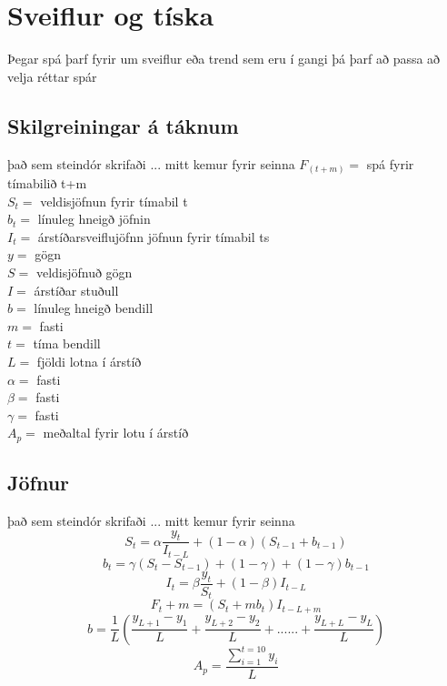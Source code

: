 \section {Sveiflur og tíska}
 

Þegar spá þarf fyrir um sveiflur eða trend sem eru í gangi þá þarf að passa að velja réttar spár

\subsection{Skilgreiningar á táknum}
 
það sem steindór skrifaði ... mitt kemur fyrir seinna
	$F_(t+m)=$ spá fyrir tímabilið  t+m \\
	$S_t =$  veldisjöfnun fyrir tímabil t\\ 	
	$b_t =$ línuleg hneigð jöfnin \\
	$I_t =$ árstíðarsveiflujöfnn jöfnun fyrir tímabil ts \\
	$y =$ gögn\\
	$S =$ veldisjöfnuð gögn \\
	$I =$	árstíðar stuðull \\
	$b =$ línuleg hneigð bendill \\
	$m =$ fasti	\\
	$t =$ tíma bendill \\
	$L =$ fjöldi lotna í árstíð \\
	$\alpha =$ fasti \\
	$\beta =$ fasti \\
	$\gamma =$ fasti \\
	$A_p =$ meðaltal fyrir lotu í árstíð\\


\subsection{Jöfnur}
	
	það sem steindór skrifaði ... mitt kemur fyrir seinna
	$$S_t = \alpha\dfrac{y_t}{I_{t - L}} + (1-\alpha)(S_{t-1}+ b_{t-1} ) $$
	$$b_t = \gamma  (S_{t}-S_{t-1})+(1- \gamma) + (1 - \gamma)b_{t-1}$$
	$$I_t = \beta \dfrac{y_t}{S_t} +(1-\beta)I_{t-L} $$
	$$F_t+m = (S_{t} +mb_{t})I_{t-L+m}$$
	$$b= \dfrac{1}{L}(\dfrac{y_{L+1}-y_1}{L} + \dfrac{y_{L+2}-y_2}{L}+......+ \dfrac{y_{L+L}-y_L}{L} ) $$
	$$A_p = \dfrac{\sum_{i=1}^{t=10} y_i}{L} $$